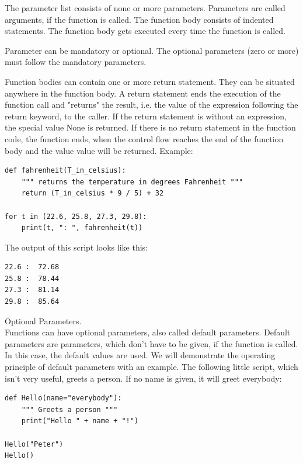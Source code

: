 \documentclass[11pt,a4paper]{article}
\begin{document}
\noindent
The parameter list consists of none or more parameters. Parameters are
called arguments, if the function is called. The function body
consists of indented statements. The function body gets executed every
time the function is called.

\smallskip \smallskip
\noindent
Parameter can be mandatory or optional. The optional parameters (zero
or more) must follow the mandatory parameters.

\smallskip \smallskip
\noindent
Function bodies can contain one or more return statement. They can be
situated anywhere in the function body. A return statement ends the
execution of the function call and "returns" the result, i.e. the
value of the expression following the return keyword, to the
caller. If the return statement is without an expression, the special
value None is returned. If there is no return statement in the
function code, the function ends, when the control flow reaches the
end of the function body and the value value will be returned.
Example:

\begin{lstlisting}
def fahrenheit(T_in_celsius):
    """ returns the temperature in degrees Fahrenheit """
    return (T_in_celsius * 9 / 5) + 32

for t in (22.6, 25.8, 27.3, 29.8):
    print(t, ": ", fahrenheit(t))
\end{lstlisting}

\smallskip \smallskip
\noindent
The output of this script looks like this:
\begin{lstlisting}
22.6 :  72.68
25.8 :  78.44
27.3 :  81.14
29.8 :  85.64
\end{lstlisting}

\smallskip \smallskip
\noindent
Optional Parameters.\\
Functions can have optional parameters, also called default
parameters. Default parameters are parameters, which don't have to be
given, if the function is called. In this case, the default values are
used. We will demonstrate the operating principle of default
parameters with an example. The following little script, which isn't
very useful, greets a person. If no name is given, it will greet
everybody:

\begin{lstlisting}
def Hello(name="everybody"):
    """ Greets a person """
    print("Hello " + name + "!")

Hello("Peter")
Hello()
\end{lstlisting}
\end{document}
